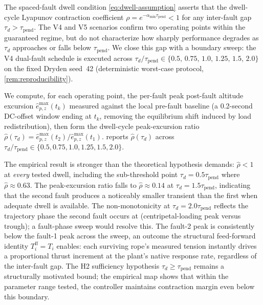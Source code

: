 The spaced-fault dwell condition \eqref{eq:dwell-assumption} asserts that the dwell-cycle Lyapunov contraction coefficient $\rho = e^{-\alpha_{\min} \tau_{\mathrm{pend}}} < 1$ for any inter-fault gap $\tau_d > \tau_{\mathrm{pend}}$. The V4 and V5 scenarios confirm two operating points within the guaranteed regime, but do not characterize how sharply performance degrades as $\tau_d$ approaches or falls below $\tau_{\mathrm{pend}}$. We close this gap with a boundary sweep: the V4 dual-fault schedule is executed across $\tau_d / \tau_{\mathrm{pend}} \in \{0.5,\,0.75,\,1.0,\,1.25,\,1.5,\,2.0\}$ on the fixed Dryden seed~42 (deterministic worst-case protocol, \cref{rem:reproducibility}).

We compute, for each operating point, the per-fault peak post-fault altitude excursion $\hat e_{p,z}^{\max}(t_k)$ measured against the local pre-fault baseline (a 0.2-second DC-offset window ending at $t_k$, removing the equilibrium shift induced by load redistribution), then form the dwell-cycle peak-excursion ratio $\hat\rho(\tau_d) = \hat e_{p,z}^{\max}(t_2)/\hat e_{p,z}^{\max}(t_1)$.  reports $\hat\rho(\tau_d)$ across $\tau_d/\tau_{\mathrm{pend}} \in \{0.5, 0.75, 1.0, 1.25, 1.5, 2.0\}$.

The empirical result is stronger than the theoretical hypothesis demands: $\hat\rho < 1$ at \emph{every} tested dwell, including the sub-threshold point $\tau_d=0.5\tau_{\mathrm{pend}}$ where ${\hat\rho}\!\approx\!0.63$. The peak-excursion ratio falls to ${\hat\rho}\!\approx\!0.14$ at $\tau_d=1.5\tau_{\mathrm{pend}}$, indicating that the second fault produces a noticeably smaller transient than the first when adequate dwell is available. The non-monotonicity at $\tau_d=2.0\tau_{\mathrm{pend}}$ reflects the trajectory phase the second fault occurs at (centripetal-loading peak versus trough); a fault-phase sweep would resolve this. The fault-2 peak is consistently below the fault-1 peak across the sweep, an outcome the structural feed-forward identity $T_i^{\mathrm{ff}}=T_i$ enables: each surviving rope's measured tension instantly drives a proportional thrust increment at the plant's native response rate, regardless of the inter-fault gap. The H2 sufficiency hypothesis $\tau_d \ge \tau_{\mathrm{pend}}$ remains a structurally motivated bound; the empirical map shows that within the parameter range tested, the controller maintains contraction margin even below this boundary.

